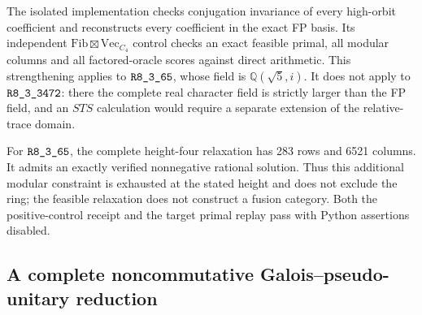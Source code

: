 The isolated implementation checks conjugation invariance of every
high-orbit coefficient and reconstructs every coefficient in the exact
FP basis. Its independent
$\mathrm{Fib}\boxtimes\mathrm{Vec}_{C_4}$ control checks an exact feasible
primal, all modular columns and all factored-oracle scores against
direct arithmetic. This strengthening applies to $\sha{R8_3_65}$, whose
field is $\mathbb Q(\sqrt5,i)$. It does not apply to $\sha{R8_3_3472}$:
there the complete real character field is strictly larger than the FP
field, and an $STS$ calculation would require a separate extension of
the relative-trace domain.

For $\sha{R8_3_65}$, the complete height-four relaxation has 283 rows and
6521 columns. It admits an exactly verified nonnegative rational
solution. Thus this additional modular constraint is exhausted at the
stated height and does not exclude the ring; the feasible relaxation
does not construct a fusion category. Both the positive-control receipt
and the target primal replay pass with Python assertions disabled.

\subsection{A complete noncommutative Galois--pseudo-unitary reduction}
\label{subsec:frontier-nc-galois-pu}

